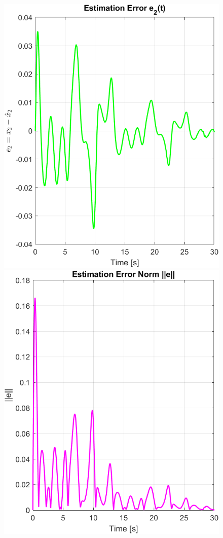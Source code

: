 \documentclass[12pt]{article} %
\numberwithin{equation}{section}  %
\begin{document}
\begin{figure}[ht!]
\begin{minipage}{0.32\textwidth}
        \includegraphics[width=0.99\linewidth]{plots/plot2_b_e2.png}
    \end{minipage}
    \hfill
    \begin{minipage}{0.32\textwidth}
        \centering
        \includegraphics[width=0.99\linewidth]{plots/plot2_c_eNorm.png}

\end{minipage}
\end{figure}
\end{document}
